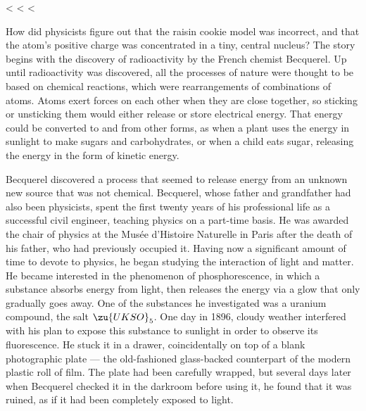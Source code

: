 <%
  <%
    <%

        How did physicists figure out that the raisin cookie model
        was incorrect, and that the atom's positive charge was
        concentrated in a tiny, central nucleus? The story begins
        with the discovery of radioactivity by the French chemist
        Becquerel. Up until radioactivity was discovered, all the
        processes of nature were thought to be based on chemical
        reactions, which were rearrangements of combinations of
        atoms. Atoms exert forces on each other when they are close
        together, so sticking or unsticking them would either
        release or store electrical energy. That energy could be
        converted to and from other forms, as when a plant uses the
        energy in sunlight to make sugars and carbohydrates, or when
        a  child eats sugar, releasing the energy in the
        form of kinetic energy.

        Becquerel discovered a process that seemed to release energy
        from an unknown new source that was not chemical. Becquerel,
        whose father and grandfather had also been physicists, spent
        the first twenty years of his professional life as a
        successful civil engineer, teaching physics  on a
        part-time basis. He was awarded the chair of physics at the
        Mus\'{e}e d'Histoire Naturelle in Paris after the death of his
        father, who had previously occupied it. Having now a
        significant amount of time to devote to physics, he began
        studying the interaction of light and matter. He became
        interested in the phenomenon of phosphorescence, in which a
        substance absorbs energy from light, then releases the
        energy via a glow that only gradually goes away. One of the
        substances he investigated was a uranium compound, the salt
        $\zu{UKSO}_5$. One day in 1896, cloudy weather interfered with
        his plan to expose this substance to sunlight in order to
        observe its fluorescence. He stuck it in a drawer,
        coincidentally on top of a blank photographic plate --- the
        old-fashioned glass-backed counterpart of the modern plastic
        roll of film. The plate had been carefully wrapped, but
        several days later when Becquerel checked it in the darkroom
        before using it, he found that it was ruined, as if it had
        been completely exposed to light.

